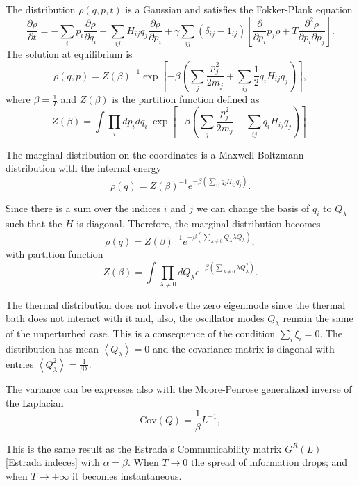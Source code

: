 The distribution $\rho(q,p,t)$ is a Gaussian and satisfies the Fokker-Plank equation \cite{Fokker}
\begin{equation}
    \frac{\partial\rho}{\partial t} = -\sum_i p_i\frac{\partial \rho}{\partial q_i} + \sum_{ij} H_{ij}q_j\frac{\partial \rho}{\partial p_i} + \gamma\sum_{ij}\left(\delta_{ij}-1_{ij}\right)\left[\frac{\partial}{\partial p_i}p_j\rho + T \frac{\partial^2\rho}{\partial p_i \partial p_j}\right].
\end{equation}
The solution at equilibrium is
\begin{equation}
    \rho(q,p) = Z(\beta)^{-1} \exp\left[ -\beta \left( \sum_j \frac{p_j^2}{2m_j} + \sum_{ij} \frac{1}{2}q_iH_{ij}q_j\right)\right],
\end{equation}
where $\beta = \frac{1}{T}$ and $Z(\beta)$ is the partition function defined as
\begin{equation}
    Z(\beta) = \int \prod_i dp_i dq_i \; \exp\left[ -\beta \left( \sum_j \frac{p_j^2}{2m_j} + \sum_{ij} q_iH_{ij}q_j\right)\right].
\end{equation}

The marginal distribution on the coordinates is a Maxwell-Boltzmann distribution with the internal energy 
\begin{equation}
    \rho(q) = Z(\beta)^{-1} e^{-\beta \left(\sum_{ij} q_iH_{ij}q_j\right)}.
\end{equation}

Since there is a sum over the indices $i$ and $j$ we can change the basis of $q_i$ to $Q_\lambda$ such that the $H$ is diagonal. Therefore, the marginal distribution becomes
\begin{equation}\label{marginal_probability}
    \rho(q) = Z(\beta)^{-1} e^{-\beta \left(\sum_{\lambda \neq 0} Q_\lambda \lambda Q_\lambda\right)},
\end{equation}
with partition function 
\begin{equation}
    Z(\beta) = \int \prod_{\lambda\neq 0} dQ_\lambda e^{-\beta \left(\sum_{\lambda \neq 0} \lambda Q_\lambda^2\right)}.
\end{equation}

The thermal distribution does not involve the zero eigenmode since the thermal bath does not interact with it and, also, the oscillator modes $Q_\lambda$ remain the same of the unperturbed case. 
This is a consequence of the condition $\sum_i \xi_i = 0$.
The distribution has mean $\left<Q_\lambda\right>= 0$ and the covariance matrix is diagonal with entries $\left<Q^2_\lambda\right>= \frac{1}{\beta \lambda}$.

The variance can be expresses also with the Moore-Penrose generalized inverse of the Laplacian
\begin{equation}
    \mathrm{Cov}(Q) = \frac{1}{\beta}L^{-1},
\end{equation}

This is the same result as the Estrada's Communicability matrix $G^R(L)$ \eqref{Estrada indeces} with $\alpha=\beta$.
When $T\rightarrow 0$ the spread of information drops; and when $T\rightarrow +\infty$ it becomes instantaneous.